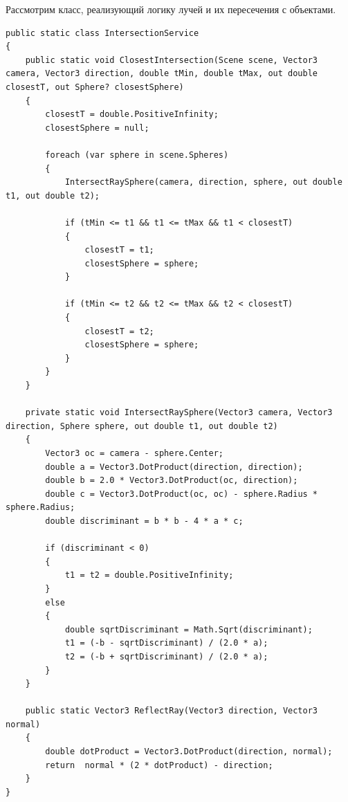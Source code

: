 Рассмотрим класс, реализующий логику лучей и их пересечения с объектами.
\begin{lstlisting}[caption={Класс IntersectionService}, label={lst:3-2}]
public static class IntersectionService
{
	public static void ClosestIntersection(Scene scene, Vector3 camera, Vector3 direction, double tMin, double tMax, out double closestT, out Sphere? closestSphere)
	{
		closestT = double.PositiveInfinity;
		closestSphere = null;
		
		foreach (var sphere in scene.Spheres)
		{
			IntersectRaySphere(camera, direction, sphere, out double t1, out double t2);
			
			if (tMin <= t1 && t1 <= tMax && t1 < closestT)
			{
				closestT = t1;
				closestSphere = sphere;
			}
			
			if (tMin <= t2 && t2 <= tMax && t2 < closestT)
			{
				closestT = t2;
				closestSphere = sphere;
			}
		}
	}
	
	private static void IntersectRaySphere(Vector3 camera, Vector3 direction, Sphere sphere, out double t1, out double t2)
	{
		Vector3 oc = camera - sphere.Center;
		double a = Vector3.DotProduct(direction, direction);
		double b = 2.0 * Vector3.DotProduct(oc, direction);
		double c = Vector3.DotProduct(oc, oc) - sphere.Radius * sphere.Radius;
		double discriminant = b * b - 4 * a * c;
		
		if (discriminant < 0)
		{
			t1 = t2 = double.PositiveInfinity;
		}
		else
		{
			double sqrtDiscriminant = Math.Sqrt(discriminant);
			t1 = (-b - sqrtDiscriminant) / (2.0 * a);
			t2 = (-b + sqrtDiscriminant) / (2.0 * a);
		}
	}
	
	public static Vector3 ReflectRay(Vector3 direction, Vector3 normal)
	{
		double dotProduct = Vector3.DotProduct(direction, normal);
		return  normal * (2 * dotProduct) - direction;
	}
}
\end{lstlisting}

